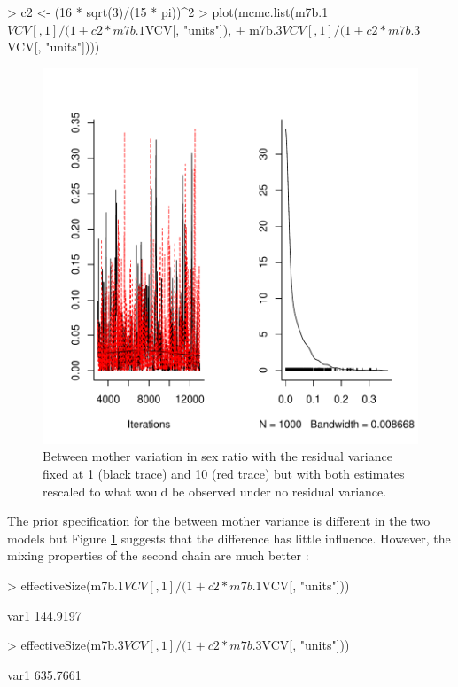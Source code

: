 \documentclass{article}
\begin{document}
\begin{Schunk}
\begin{Sinput}
> c2 <- (16 * sqrt(3)/(15 * pi))^2
> plot(mcmc.list(m7b.1$VCV[, 1]/(1 + c2 * m7b.1$VCV[, "units"]), 
+     m7b.3$VCV[, 1]/(1 + c2 * m7b.3$VCV[, "units"])))
\end{Sinput}
\end{Schunk}

\begin{figure}[!h]
\begin{center}
\includegraphics{Lecture8-023}
\end{center}
\caption{Between mother variation in sex ratio with the residual variance fixed at 1 (black trace) and 10 (red trace) but with both estimates rescaled to what would be observed under no residual variance.}
\label{sexratio2}
\end{figure}


The prior specification for the between mother variance is different in the two models but Figure \ref{sexratio2} suggests that the difference has little influence. However, the mixing properties of the second chain are much better \citep{vanDyk.2001}:

\begin{Schunk}
\begin{Sinput}
> effectiveSize(m7b.1$VCV[, 1]/(1 + c2 * m7b.1$VCV[, "units"]))
\end{Sinput}
\begin{Soutput}
    var1 
144.9197 
\end{Soutput}
\begin{Sinput}
> effectiveSize(m7b.3$VCV[, 1]/(1 + c2 * m7b.3$VCV[, "units"]))
\end{Sinput}
\begin{Soutput}
    var1 
635.7661 
\end{Soutput}
\end{Schunk}
\end{document}
